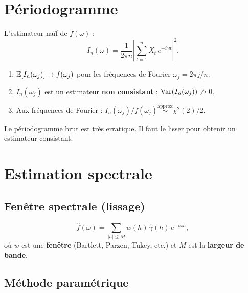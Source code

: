 \section{P\'eriodogramme}

\begin{definition}[P\'eriodogramme]
L'estimateur na\"if de $f(\omega)$ :
\[
I_n(\omega) = \frac{1}{2\pi n}\left|\sum_{t=1}^n X_t\,e^{-i\omega t}\right|^2.
\]
\end{definition}

\begin{theoreme}
\begin{enumerate}
\item $\mathbb{E}[I_n(\omega_j)]\to f(\omega_j)$ pour les fr\'equences de Fourier $\omega_j=2\pi j/n$.
\item $I_n(\omega_j)$ est un estimateur \textbf{non consistant} : $\operatorname{Var}(I_n(\omega_j))\not\to 0$.
\item Aux fr\'equences de Fourier : $I_n(\omega_j)/f(\omega_j)\stackrel{\text{approx}}{\sim}\chi^2(2)/2$.
\end{enumerate}
\end{theoreme}

\begin{attention}
Le p\'eriodogramme brut est tr\`es erratique. Il faut le lisser pour obtenir un estimateur consistant.
\end{attention}

\section{Estimation spectrale}

\subsection{Fen\^etre spectrale (lissage)}

\begin{definition}
\[
\hat{f}(\omega) = \sum_{|h|\leq M} w(h)\,\hat{\gamma}(h)\,e^{-i\omega h},
\]
o\`u $w$ est une \textbf{fen\^etre} (Bartlett, Parzen, Tukey, etc.) et $M$ est la \textbf{largeur de bande}.
\end{definition}

\subsection{M\'ethode param\'etrique}

